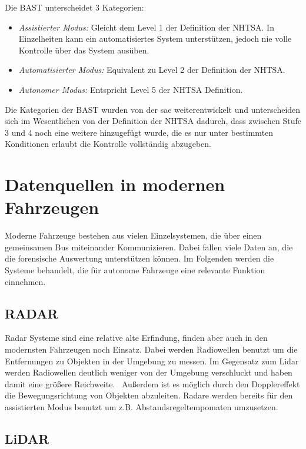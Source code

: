 \documentclass[conference,compsoc,final,a4paper]{IEEEtran}
\begin{document}
Die \ac{BAST} unterscheidet 3 Kategorien\cite{bast2021}:

\begin{itemize}
  \item \emph{Assistierter Modus:} Gleicht dem Level 1 der Definition der \ac{NHTSA}. In Einzelheiten kann ein automatisiertes System unterstützen, jedoch nie volle Kontrolle über das System ausüben.
  \item \emph{Automatisierter Modus:} Equivalent zu Level 2 der Definition der \ac{NHTSA}.
  \item \emph{Autonomer Modus:} Entspricht Level 5 der \ac{NHTSA} Definition.
\end{itemize}

Die Kategorien der \ac{BAST} wurden von der \ac{sae} weiterentwickelt\cite{bast2021} und unterscheiden sich im Wesentlichen von der Definition der \ac{NHTSA} dadurch, dass zwischen Stufe 3 und 4 noch eine weitere hinzugefügt wurde, die es nur unter bestimmten Konditionen erlaubt die Kontrolle vollständig abzugeben\cite{SAE2021}.

\section{Datenquellen in modernen Fahrzeugen}

Moderne Fahrzeuge bestehen aus vielen Einzelsystemen, die über einen gemeinsamen Bus miteinander Kommunizieren.
Dabei fallen viele Daten an, die die forensische Auswertung unterstützen können. Im Folgenden werden die Systeme behandelt,
die für autonome Fahrzeuge eine relevante Funktion einnehmen.


\subsection{RADAR}

Radar Systeme sind eine relative alte Erfindung, finden aber auch in den modernsten Fahrzeugen noch Einsatz.
Dabei werden Radiowellen benutzt um die Entfernungen zu Objekten in der Umgebung zu messen.
Im Gegensatz zum Lidar werden Radiowellen deutlich weniger von der Umgebung verschluckt und haben damit eine
größere Reichweite.~\cite{Neal2018} Außerdem ist es möglich durch den Dopplereffekt die Bewegungsrichtung von Objekten abzuleiten.
Radare werden bereits für den assistierten Modus benutzt um z.B. Abstandsregeltempomaten umzusetzen.

\subsection{LiDAR}
\end{document}
